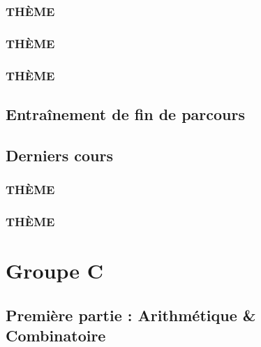 \documentclass[poly,trombi]{valbonne}
\begin{document}

\subsection{THÈME}


\subsection{THÈME}


\subsection{THÈME}



\section{Entraînement de fin de parcours}



\section{Derniers cours}

\subsection{THÈME}


\subsection{THÈME}







\chapter{Groupe C}

\minitoc \clearpage

\section{Première partie : Arithmétique \& Combinatoire}
\end{document}
